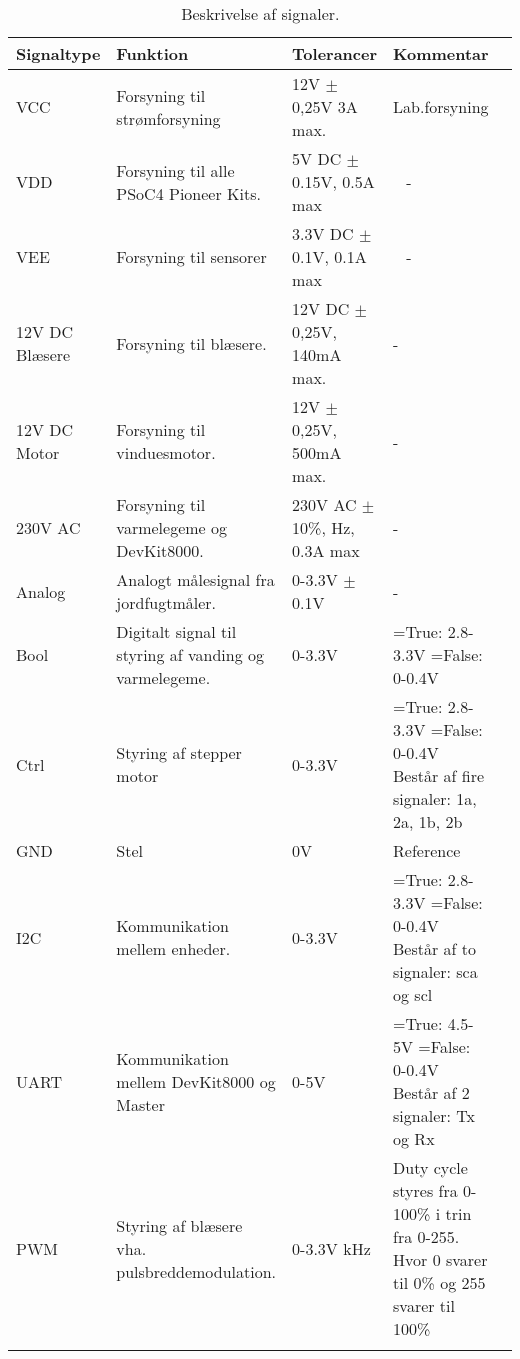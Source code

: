 \begin{longtable}{| l | >{\raggedright}X | >{\raggedright}X | >{\raggedright\arraybackslash}X |>{\raggedright}X |}
\hline
	\textbf{Signaltype} & \textbf{Funktion} & \textbf{Tolerancer} & \textbf{Kommentar}\\ \hline
	VCC & Forsyning til strømforsyning & 12V $\pm$ 0,25V \newline 3A max. & Lab.forsyning  \\\hline	
	VDD & Forsyning til alle PSoC4 Pioneer Kits. & 5V DC $\pm$ 0.15V, \newline 0.5A max & ~ - \\\hline
	VEE & Forsyning til sensorer & 3.3V DC $\pm$ 0.1V, \newline 0.1A max & ~ - \\\hline
	12V DC Blæsere & Forsyning til blæsere. & 12V DC $\pm$ 0,25V, \newline 140mA max. & - \\\hline	
	12V DC Motor & Forsyning til vinduesmotor. & 12V $\pm$ 0,25V, \newline 500mA max. & - \\\hline
	230V AC & Forsyning til varmelegeme og DevKit8000. & 230V AC $\pm$ 10\%, \newline 50 Hz, \newline 0.3A max & - \\\hline
	Analog & Analogt målesignal fra jordfugtmåler. & 0-3.3V $\pm$ 0.1V & - \\\hline	
	Bool & Digitalt signal til styring af vanding og varmelegeme. & 0-3.3V & 1=True: 2.8-3.3V \newline 0=False: 0-0.4V \\\hline	
	Ctrl & Styring af stepper motor & 0-3.3V & 1=True: 2.8-3.3V \newline 0=False: 0-0.4V  \newline Består af fire signaler: \newline 1a, 2a, 1b, 2b \\\hline	
	GND & Stel & 0V & Reference \\\hline	
	I2C & Kommunikation mellem \IIC enheder. & 0-3.3V & 1=True: 2.8-3.3V \newline 0=False: 0-0.4V \newline Består af to signaler: \newline sca og scl \\\hline	
	UART & Kommunikation mellem DevKit8000 og Master & 0-5V & 1=True: 4.5-5V \newline 0=False: 0-0.4V \newline Består af 2 signaler: \newline Tx og Rx \\\hline	
	PWM & Styring af blæsere vha. pulsbreddemodulation. & 0-3.3V \newline 1 kHz & Duty cycle styres fra 0-100\% i trin fra 0-255. Hvor 0 svarer til 0\% og 255 svarer til 100\% \\\hline
\caption{Beskrivelse af signaler.}
\label{tbl:signalbeskriv}
\end{longtable}